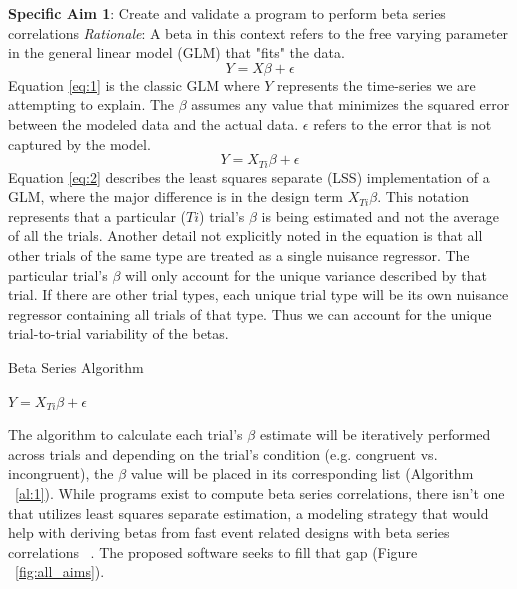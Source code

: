 \documentclass[phd,appendix,figures]{uithesis}
\begin{document}
\textbf{Specific Aim 1}: Create and validate a program to perform beta series correlations
\newline
\newline
\textit{Rationale}: A beta in this context refers to the free varying parameter in the general linear model (GLM) that "fits" the data.
\begin{equation}
	Y = X\beta + \epsilon 
	\label{eq:1}
\end{equation}
Equation \ref{eq:1} is the classic GLM where $Y$ represents the time-series we are attempting to explain.
The $\beta$ assumes any value that minimizes the squared error between the modeled data and the actual data. 
$\epsilon$ refers to the error that is not captured by the model.
\begin{equation} \label{eq:2}
Y = X_{Ti}\beta + \epsilon
\end{equation}
Equation \ref{eq:2} describes the least squares separate (LSS) implementation of a GLM, where the major difference is in the design term $X_{Ti}\beta$.
This notation represents that a particular ($Ti$) trial's $\beta$ is being estimated and not the average of all the trials.
Another detail not explicitly noted in the equation is that all other trials of the same type are treated as a single nuisance regressor.
The particular trial's $\beta$ will only account for the unique variance described by that trial.
If there are other trial types, each unique trial type will be its own nuisance regressor containing all trials of that type.
Thus we can account for the unique trial-to-trial variability of the betas.
\begin{algorithm}
	\caption{Beta Series Algorithm}\label{al:1}
	\begin{algorithmic}[1]
    		\STATE \texttt{$Y = X_{Ti}\beta + \epsilon$}
		\ENDFOR
	\end{algorithmic}
\end{algorithm}
The algorithm to calculate each trial's $\beta$ estimate will be iteratively performed across trials and depending on the trial's condition (e.g. congruent vs. incongruent), the $\beta$ value will be placed in its corresponding list (Algorithm ~\ref{al:1}).
While programs exist to compute beta series correlations, there isn't one that utilizes least squares separate estimation, a modeling strategy that would help with deriving betas from fast event related designs with beta series correlations ~\citep{Mumford2012,Gottlich2015}. 
The proposed software seeks to fill that gap (Figure ~\ref{fig:all_aims}).
\end{document}
